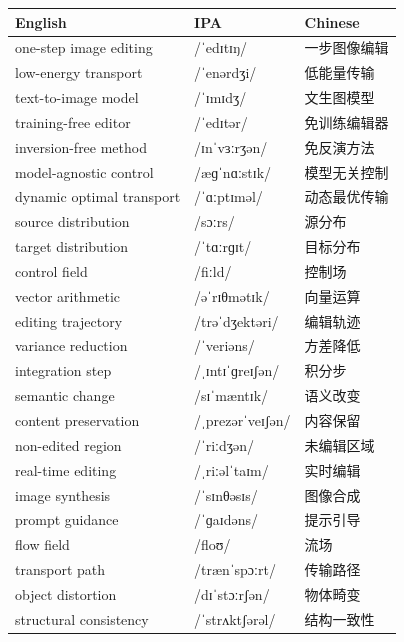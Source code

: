 \documentclass[UTF8,12pt,a4paper]{ctexart}
\providecommand{\zh}[1]{#1}
\begin{document}
\begin{tabular*}{\textwidth}{@{\extracolsep{\fill}}lll@{}}
\toprule
\textbf{English} & \textbf{IPA} & \textbf{Chinese} \\
\midrule
one-step image editing & {\ipafont /ˈedɪtɪŋ/} & \zh{一步图像编辑} \\
low-energy transport & {\ipafont /ˈenərdʒi/} & \zh{低能量传输} \\
text-to-image model & {\ipafont /ˈɪmɪdʒ/} & \zh{文生图模型} \\
training-free editor & {\ipafont /ˈedɪtər/} & \zh{免训练编辑器} \\
inversion-free method & {\ipafont /ɪnˈvɜːrʒən/} & \zh{免反演方法} \\
model-agnostic control & {\ipafont /æɡˈnɑːstɪk/} & \zh{模型无关控制} \\
dynamic optimal transport & {\ipafont /ˈɑːptɪməl/} & \zh{动态最优传输} \\
source distribution & {\ipafont /sɔːrs/} & \zh{源分布} \\
target distribution & {\ipafont /ˈtɑːrɡɪt/} & \zh{目标分布} \\
control field & {\ipafont /fiːld/} & \zh{控制场} \\
vector arithmetic & {\ipafont /əˈrɪθmətɪk/} & \zh{向量运算} \\
editing trajectory & {\ipafont /trəˈdʒektəri/} & \zh{编辑轨迹} \\
variance reduction & {\ipafont /ˈveriəns/} & \zh{方差降低} \\
integration step & {\ipafont /ˌɪntɪˈɡreɪʃən/} & \zh{积分步} \\
semantic change & {\ipafont /sɪˈmæntɪk/} & \zh{语义改变} \\
content preservation & {\ipafont /ˌprezərˈveɪʃən/} & \zh{内容保留} \\
non-edited region & {\ipafont /ˈriːdʒən/} & \zh{未编辑区域} \\
real-time editing & {\ipafont /ˌriːəlˈtaɪm/} & \zh{实时编辑} \\
image synthesis & {\ipafont /ˈsɪnθəsɪs/} & \zh{图像合成} \\
prompt guidance & {\ipafont /ˈɡaɪdəns/} & \zh{提示引导} \\
flow field & {\ipafont /floʊ/} & \zh{流场} \\
transport path & {\ipafont /trænˈspɔːrt/} & \zh{传输路径} \\
object distortion & {\ipafont /dɪˈstɔːrʃən/} & \zh{物体畸变} \\
structural consistency & {\ipafont /ˈstrʌktʃərəl/} & \zh{结构一致性} \\

\end{tabular*}
\end{document}
